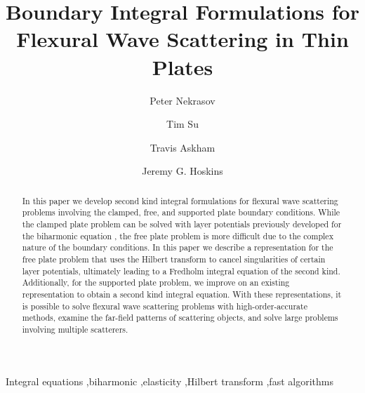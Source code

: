 \documentclass[preprint,12pt,3p]{elsarticle}
\begin{document}
\begin{frontmatter}



\title{Boundary Integral Formulations for Flexural Wave Scattering in Thin Plates}





\author[1]{Peter Nekrasov}

\author[1]{Tim Su}

\author[2]{Travis Askham}
 
\author[1]{Jeremy G. Hoskins}




\begin{abstract}
In this paper we develop second kind integral formulations  for flexural wave scattering problems involving the clamped, free, and supported plate boundary conditions. While the clamped plate problem can be solved with layer potentials previously developed for the biharmonic equation \cite{farkas}, the free plate problem is more difficult due to the complex nature of the boundary conditions. In this paper we describe a representation for the free plate problem that uses the Hilbert transform to cancel singularities of certain layer potentials, ultimately leading to a Fredholm integral equation of the second kind. Additionally, for the supported plate problem, we improve on an existing representation to obtain a second kind integral equation.  With these representations, it is possible to solve flexural wave scattering problems with high-order-accurate methods, examine the far-field patterns of scattering objects, and solve large problems involving multiple scatterers.
\end{abstract}



\begin{keyword}
Integral equations \sep biharmonic \sep elasticity \sep Hilbert transform \sep fast algorithms

\end{keyword}

\end{frontmatter}
\end{document}
